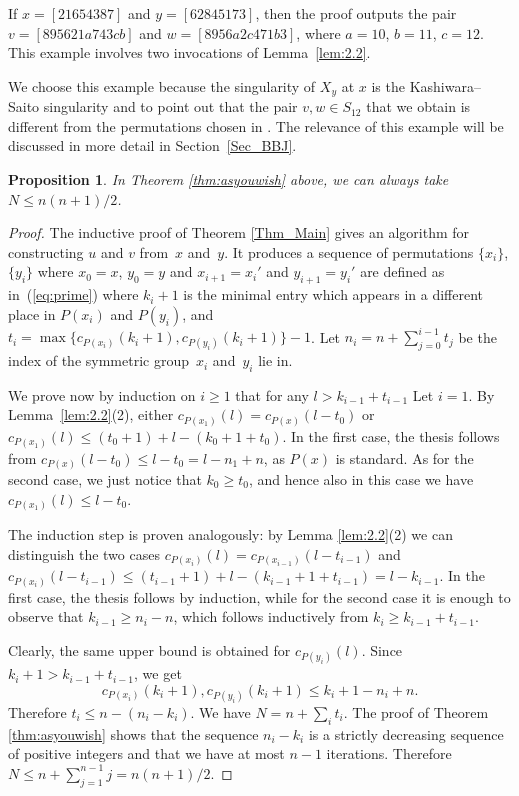\documentclass[pdftex]{sigma}
\numberwithin{equation}{section}
\newtheorem{Proposition}[Theorem]{Proposition}
 { \theoremstyle{definition}
\newtheorem{Definition}[Theorem]{Definition}
\newtheorem{Example}[Theorem]{Example}
\newtheorem{Remark}[Theorem]{Remark} }
\begin{document}
\begin{Example}\label{eg:ks}
If $x=[2 1 6 5 4 3 8 7]$ and $y=[62845173]$, then the proof outputs the pair $v=[895621a743cb]$ and $w=[8956a2c471b3]$, where $a=10$, $b=11$, $c=12$. This example involves two invocations of Lemma~\ref{lem:2.2}.
\end{Example}

We choose this example because the singularity of $X_y$ at $x$ is the Kashiwara--Saito singularity \cite[Example~8.3.1]{kashiwarasaito} and to point out that the pair $v,w\in S_{12}$ that we obtain is different from the permutations chosen in \cite[Section~3.5]{williamson}. The relevance of this example will be discussed in more detail in Section~\ref{Sec_BBJ}.

\begin{Proposition}\label{prop:bound}
In Theorem {\rm \ref{thm:asyouwish}} above, we can always take $N\leq n(n+1)/2$.
\end{Proposition}

\begin{proof}
The inductive proof of Theorem \ref{Thm_Main} gives an algorithm for constructing $u$ and $v$ from~$x$ and~$y$. It produces a sequence of permutations $\{x_i\}$, $\{y_i\}$ where $x_0=x$, $y_0=y$ and $x_{i+1}=x_i'$ and $y_{i+1}=y_i'$ are defined as in~(\ref{eq:prime}) where $k_i+1$ is the minimal entry which appears in a different place in $P(x_i)$ and $P(y_i)$, and $t_i=\max\{c_{P(x_i)}(k_i+1),c_{P(y_i)}(k_i+1)\}-1$. Let $n_i=n+\sum_{j=0}^{i-1}t_j$ be the index of the symmetric group~$x_i$ and~$y_i$ lie in.

We prove now by induction on $i\geq 1$ that for any $l>k_{i-1}+t_{i-1}$
Let $i=1$. By Lemma~\ref{lem:2.2}(2), either $c_{P(x_1)}(l)=c_{P(x)}(l-t_0)$ or $c_{P(x_1)}(l)\leq (t_0+1)+l-(k_0+1+t_0)$. In the first case,
the thesis follows from $c_{P(x)}(l-t_0)\leq l-t_0=l-n_1+n$, as $P(x)$ is standard. As for the second case, we just notice that $k_0\geq t_0$, and hence also in this case we have $c_{P(x_1)}(l)\leq l-t_0$.

The induction step is proven analogously: by Lemma \ref{lem:2.2}(2) we can distinguish the two cases $c_{P(x_i)}(l)=c_{P(x_{i-1})}(l-t_{i-1})$ and $c_{P(x_i)}(l-t_{i-1})\leq (t_{i-1}+1)+l-(k_{i-1}+1+t_{i-1})=l-k_{i-1}$. In the first case, the thesis follows by induction, while for the second case it is enough to observe that $k_{i-1}\geq n_i-n$, which follows inductively from $k_i\geq k_{i-1}+t_{i-1}$.

Clearly, the same upper bound is obtained for $c_{P(y_i)}(l)$. Since $k_{i}+1> k_{i-1}+t_{i-1}$, we get
\[
c_{P(x_i)}(k_i+1), c_{P(y_i)}(k_i+1)\leq k_i+1-n_i+n.
\]
Therefore $t_i\leq n-(n_i-k_i)$. We have $N=n+\sum_i t_i$. The proof of Theorem \ref{thm:asyouwish} shows that the sequence $n_i-k_i$ is a strictly decreasing sequence of positive integers and that we have at most $n-1$ iterations. Therefore $N\leq n+\sum_{j=1}^{n-1}j=n(n+1)/2$.
\end{proof}
\end{document}
